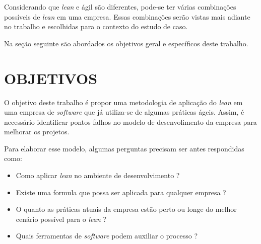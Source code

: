 Considerando que \textit{lean} e ágil são diferentes, pode-se ter várias combinações possíveis de \textit{lean} em uma empresa. Essas combinações serão vistas mais adiante no trabalho e escolhidas para o contexto do estudo de caso.



Na seção seguinte são abordados os objetivos geral e específicos deste trabalho.

\section{OBJETIVOS}
\label{chap1:obj}
O objetivo deste trabalho é propor uma metodologia de aplicação do \textit{lean} em uma empresa de \textit{software} que já utiliza-se de algumas práticas ágeis. Assim, é necessário identificar pontos falhos no modelo de desenvolimento da empresa para melhorar os projetos.

Para elaborar esse modelo, algumas perguntas precisam ser antes respondidas como:

\begin{itemize}
	\item Como aplicar \textit{lean} no ambiente de desenvolvimento ?
	\item Existe uma formula que possa ser aplicada para qualquer empresa ?
	\item O quanto as práticas atuais da empresa estão perto ou longe do melhor cenário possível para o \textit{lean} ?
	\item Quais ferramentas de \textit{software} podem auxiliar o processo ?
\end{itemize}


